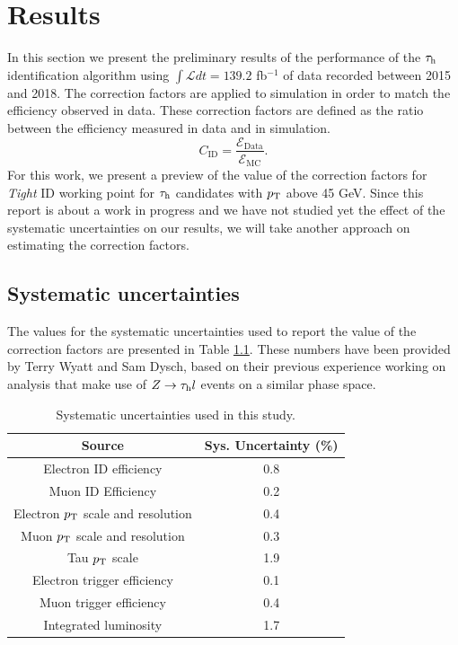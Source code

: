 \chapter{Results}\label{chap5}
In this section we present the preliminary results of the performance of the $\tau_\text{h}$ identification algorithm using $\int\mathcal{L} dt=139.2$ fb$^{-1}$ of data recorded between 2015 and 2018.
The correction factors are applied to simulation in order to match the efficiency observed in data. These correction factors are defined as the ratio between the efficiency measured in data and in simulation.
\begin{equation}
C_{\text{ID}}=\frac{\mathcal{E}_{\text{Data}}}{\mathcal{E}_{\text{MC}}}.
\end{equation}
For this work, we present a preview of the value of the correction factors for \textit{Tight} ID working point for $\tau_\text{h}$ candidates with $p_\text{T}$ above 45 GeV. Since this report is about a work in progress and we have not studied yet the effect of the systematic uncertainties on our results, we will take another approach on estimating the correction factors.

\section{Systematic uncertainties}
The values for the systematic uncertainties used to report the value of the correction factors are presented in Table \ref{Tab5}. These numbers have been provided by Terry Wyatt and Sam Dysch, based on their previous experience working on analysis that make use of $Z\to\tau_\text{h} l$ events on a similar phase space.
\begin{table}[]
	\centering
	\begin{tabular}{cc}
		\hline
		\multicolumn{1}{|c|}{Source}        & \multicolumn{1}{c|}{Sys. Uncertainty (\%)} \\ \hline
		Electron ID efficiency              & 0.8                                        \\
		Muon ID Efficiency                  & 0.2                                        \\
		Electron $p_\text{T}$ scale and resolution & 0.4                                        \\
		Muon $p_\text{T}$ scale and resolution     & 0.3                                        \\
		Tau $p_\text{T}$ scale                     & 1.9                                        \\
		Electron trigger efficiency         & 0.1                                        \\
		Muon trigger efficiency             & 0.4                                        \\ 
		Integrated luminosity               & 1.7                                        \\ \hline
	\end{tabular}
	\caption{Systematic uncertainties used in this study.}
	\label{Tab5}
\end{table}
